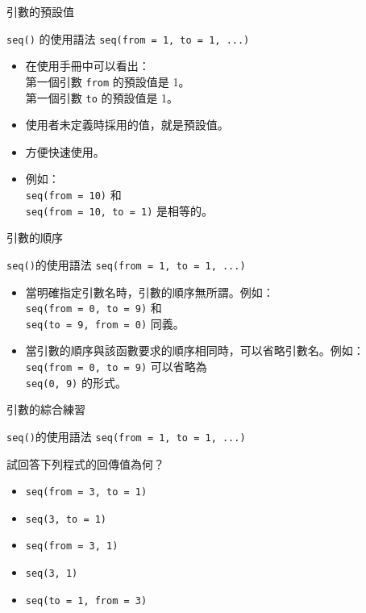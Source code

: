 \documentclass[12pt]{beamer}
\begin{document}
\begin{frame}[fragile]{引數的預設值}

\begin{block}{\texttt{seq()} 的使用語法}
\verb+seq(from = 1, to = 1, ...)+ \\
\end{block}
\begin{itemize}
\item 在使用手冊中可以看出：
  \\ 第一個引數 \verb+from+ 的預設值是 1。
  \\ 第一個引數 \verb+to+ 的預設值是 1。
\item 使用者未定義時採用的值，就是預設值。
\item 方便快速使用。
\item 例如：\\
  \verb+seq(from = 10)+ 和 \\
  \verb+seq(from = 10, to = 1)+ 是相等的。
\end{itemize}
\end{frame}


\begin{frame}[fragile]{引數的順序}

\begin{block}{\texttt{seq()}的使用語法}
\verb+seq(from = 1, to = 1, ...)+ \\
\end{block}

\begin{itemize}
\item 當明確指定引數名時，引數的順序無所謂。例如：\\ \verb+seq(from = 0, to = 9)+ 和 \\ \verb+seq(to = 9, from = 0)+ 同義。
\item 當引數的順序與該函數要求的順序相同時，可以省略引數名。例如：\\ \verb+seq(from = 0, to = 9)+ 可以省略為 \\ \verb+seq(0, 9)+ 的形式。
\end{itemize}
\end{frame}


\begin{frame}[fragile]{引數的綜合練習}

\begin{block}{\texttt{seq()}的使用語法}
\verb+seq(from = 1, to = 1, ...)+ \\
\end{block}

試回答下列程式的回傳值為何？
\begin{itemize}
\item \verb+seq(from = 3, to = 1)+
\item \verb+seq(3, to = 1)+
\item \verb+seq(from = 3, 1)+
\item \verb+seq(3, 1)+
\item \verb+seq(to = 1, from = 3)+
\end{itemize}
\end{frame}
\end{document}
